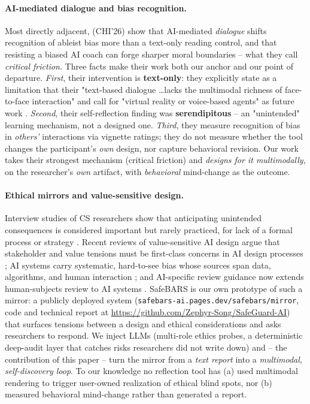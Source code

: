 \documentclass[manuscript,screen]{acmart}
\begin{document}
\paragraph{AI-mediated dialogue and bias recognition.}
Most directly adjacent, \citep{taheri26} (CHI'26) show that AI-mediated \emph{dialogue}
shifts recognition of ableist bias more than a text-only reading control, and that
resisting a biased AI coach can forge sharper moral boundaries -- what they call
\emph{critical friction}. Three facts make their work both our anchor and our point of
departure. \emph{First}, their intervention is \textbf{text-only}: they explicitly state
as a limitation that their "text-based dialogue \dots lacks the multimodal richness of
face-to-face interaction" and call for "virtual reality or voice-based agents" as future
work \cite{taheri26}. \emph{Second}, their self-reflection finding was \textbf{serendipitous}
-- an "unintended" learning mechanism, not a designed one. \emph{Third}, they measure
recognition of bias in \emph{others'} interactions via vignette ratings; they do not
measure whether the tool changes the participant's \emph{own} design, nor capture
behavioral revision. Our work takes their strongest mechanism (critical friction) and
\emph{designs for it multimodally}, on the researcher's \emph{own} artifact, with
\emph{behavioral} mind-change as the outcome.

\paragraph{Ethical mirrors and value-sensitive design.}
Interview studies of CS researchers show that anticipating unintended consequences
is considered important but rarely practiced, for lack of a formal process or
strategy \citep{do2023}. Recent reviews of value-sensitive AI design argue that
stakeholder and value tensions must be first-class concerns in AI design processes
\citep{sadek2023}; AI systems carry systematic, hard-to-see bias whose sources span
data, algorithms, and human interaction \citep{ferrara2024}; and AI-specific review
guidance now extends human-subjects review to AI systems \citep{makridis2023}.
SafeBARS is our own prototype of such a mirror: a publicly deployed system
(\texttt{safebars-ai.pages.dev/safebars/mirror}, code and technical report at
\url{https://github.com/Zephyr-Song/SafeGuard-AI}) that surfaces tensions between a
design and ethical considerations and asks researchers to respond. We inject LLMs
(multi-role ethics probes, a deterministic deep-audit layer that catches risks
researchers did not write down) and -- the contribution of this paper -- turn the
mirror from a \emph{text report} into a \emph{multimodal, self-discovery loop}.
To our knowledge no reflection tool has (a) used multimodal rendering to trigger
user-owned realization of ethical blind spots, nor (b) measured behavioral mind-change
rather than generated a report.
\end{document}
